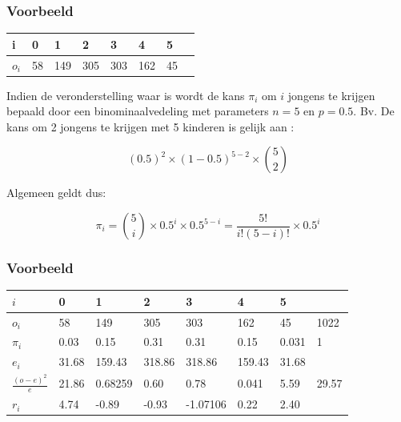 \documentclass[aspectratio=169]{beamer}
\begin{document}
\begin{frame}
  \frametitle{Voorbeeld}
  \begin{table}[h]
\begin{tabular}{@{}llllllll@{}}
\toprule
i       & 0  & 1   & 2   & 3   & 4   & 5  &  \\ \midrule
$o_{i}$ & 58 & 149 & 305 & 303 & 162 & 45 &  \\ \bottomrule
\end{tabular}
\end{table}
\pause
Indien de veronderstelling waar is wordt de kans $\pi_{i}$ om $i$ jongens te krijgen bepaald door een binominaalvedeling met parameters $n=5$ en $p=0.5$.
Bv. De kans om 2 jongens te krijgen met 5 kinderen is gelijk aan :

\[ (0.5)^{2} \times (1-0.5)^{5-2} \times \binom{5}{2} \]

Algemeen geldt dus:

\[ \pi_{i} = \binom{5}{i}\times 0.5^{i} \times 0.5^{5-i} = \frac{5!}{i!(5-i)!}\times 0.5^{i} \]
\end{frame}

\begin{frame}
  \frametitle{Voorbeeld}
  \begin{table}[h]
\begin{tabular}{@{}llllllll@{}}
\toprule
$i$                         & 0        & 1        & 2        & 3        & 4       & 5       &         \\ \midrule
$o_i$                      & 58       & 149      & 305      & 303      & 162     & 45      & 1022    \\
$\pi_i$                      & 0.03    & 0.15    & 0.31    & 0.31  & 0.15 & 0.031 & 1       \\
$e_i$                      & 31.68   & 159.43  & 318.86  & 318.86  & 159.43 & 31.68  &         \\
$\frac{(o-e)^{2}}{e}$ & 21.86 & 0.68259  & 0.60   & 0.78  & 0.041 & 5.59 & 29.57 \\
$r_i$                      & 4.74   & -0.89 & -0.93 & -1.07106 & 0.22 & 2.40 &         \\ \bottomrule
\end{tabular}
\end{table}
\end{frame}
\end{document}
